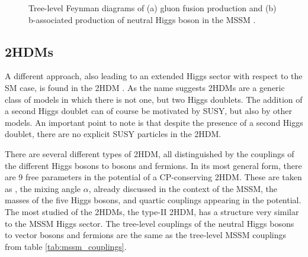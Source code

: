 \begin{figure}[h!]
\begin{center}
\end{center}
\caption{Tree-level Feynman diagrams of (a) gluon fusion production and (b) b-associated
production of neutral Higgs boson in the MSSM \cite{CMS-PAS-HIG-16-037}.}
\label{fig:production_mssm}
\end{figure}

\subsection{\acl{2HDM}s}
\label{sec:theory_2HDM}
A different approach, also leading to an extended Higgs sector with
respect to the \ac{SM} case, is found in the \ac{2HDM} \cite{2HDM-I,2HDM-II}.
As the name suggests \ac{2HDM}s are a generic class of models in which
there is not one, but two Higgs doublets. The addition of a second
Higgs doublet can of course be motivated by \ac{SUSY}, but also by other models.
An important point to note is that despite the presence of a second 
Higgs doublet, there are no explicit \ac{SUSY} particles in the \ac{2HDM}.

There are several different types of \ac{2HDM}, all distinguished by the couplings
of the different Higgs bosons to bosons and fermions. In its most general
form, there are 9 free parameters in the potential of a CP-conserving 2HDM. 
These are taken as \tanb, the mixing angle $\alpha$, already discussed in 
the context of the \ac{MSSM}, the masses of the five Higgs bosons,
and quartic couplings appearing in the potential. The most studied of the
\ac{2HDM}s, the type-II \ac{2HDM}, has a structure very similar to 
the MSSM Higgs sector. The tree-level couplings of the neutral Higgs bosons to 
vector bosons and fermions are the same as the tree-level \ac{MSSM} couplings 
from table \ref{tab:mssm_couplings}. %


